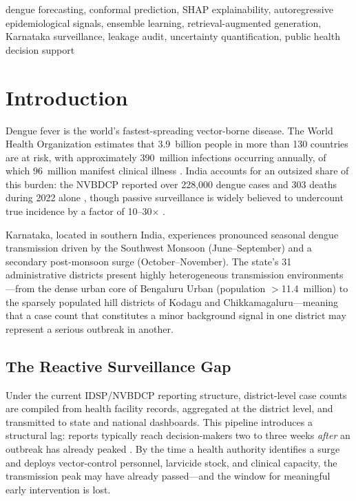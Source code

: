 \documentclass[conference]{IEEEtran}
\begin{document}
\begin{IEEEkeywords}
dengue forecasting, conformal prediction, SHAP explainability,
autoregressive epidemiological signals, ensemble learning,
retrieval-augmented generation, Karnataka surveillance, leakage audit,
uncertainty quantification, public health decision support
\end{IEEEkeywords}

\section{Introduction}
\label{sec:intro}

Dengue fever is the world's fastest-spreading vector-borne disease.
The World Health Organization estimates that 3.9~billion people in
more than 130 countries are at risk, with approximately 390~million
infections occurring annually, of which 96~million manifest clinical
illness \cite{who_dengue}. India accounts for an outsized share of
this burden: the NVBDCP reported over 228,000 dengue cases and 303
deaths during 2022 alone \cite{nvbdcp2022}, though passive
surveillance is widely believed to undercount true incidence by a
factor of 10--30$\times$ \cite{kakarla2023}.

Karnataka, located in southern India, experiences pronounced seasonal
dengue transmission driven by the Southwest Monsoon (June--September)
and a secondary post-monsoon surge (October--November).
The state's 31 administrative districts present highly heterogeneous
transmission environments---from the dense urban core of Bengaluru
Urban (population $>$11.4~million) to the sparsely populated
hill districts of Kodagu and Chikkamagaluru---meaning that a case
count that constitutes a minor background signal in one district
may represent a serious outbreak in another.

\subsection{The Reactive Surveillance Gap}

Under the current IDSP/NVBDCP reporting structure, district-level
case counts are compiled from health facility records, aggregated at
the district level, and transmitted to state and national dashboards.
This pipeline introduces a structural lag: reports typically reach
decision-makers two to three weeks \emph{after} an outbreak has
already peaked \cite{nvbdcp2022}. By the time a health authority
identifies a surge and deploys vector-control personnel, larvicide
stock, and clinical capacity, the transmission peak may have already
passed---and the window for meaningful early intervention is lost.
\end{document}
